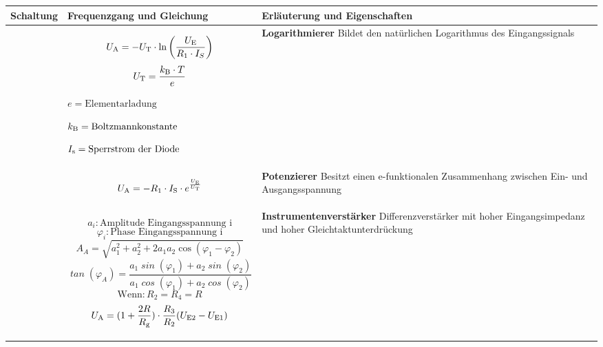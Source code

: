 \newpage
    \begin{table}[ht]
        \begin{tabular}{|m{}|m{}|m{}|}
            \hline 
    Schaltung & Frequenzgang und Gleichung & Erläuterung und Eigenschaften \\ %
    \hline
    
    &
    \begin{center}
    \[
    U_{\textnormal{A}} =-U_{\textnormal{T}}\cdot \ln{\left(\frac{U_{\textnormal{E}}}{R_1\cdot I_S}\right)}
    \]
        \[
            U_{\textnormal{T}} = \frac{k_{\textnormal{B}} \cdot T}{e}
            \]
            
            \(e = \text{Elementarladung}\)
            
            \(k_{\textnormal{B}} = \text{Boltzmannkonstante}\)
            
            \(I_{\textnormal{s}} = \text{Sperrstrom der Diode}\)
    \end{center} 
    & 
    \textbf{Logarithmierer}\newline
    Bildet den natürlichen Logarithmus des Eingangssignals
    \\
    \hline
    
    &
    \begin{center}
    \[
    U_{\textnormal{A}} =-R_1\cdot I_{\textnormal{S}} \cdot e^{\frac{U_{\textnormal{E}}}{U_{\textnormal{T}}}}
    \]
    \end{center} 
    & 
    \textbf{Potenzierer}\newline
    Besitzt einen e-funktionalen Zusammenhang zwischen Ein- und Ausgangsspannung
    \\
    \hline
    
     &
         \begin{center}
   
\end{center}

\vspace{1ex}
\[
\mathit{a_i} : \text{Amplitude Eingangsspannung i}
\]
\[
\mathit{\varphi_i} : \text{Phase Eingangsspannung i}
\]
\[
\mathit{A}_{A} = \sqrt{a_1^2 + a_2^2 + 2a_1a_2 \cos(\varphi_1 - \varphi_2)}
\]
\[
\mathit{\tan}(\varphi_A) = \frac{a_1 \mathit{\sin}(\varphi_1) + a_2 \mathit{\sin}(\varphi_2)}{a_1 \mathit{\cos}(\varphi_1) + a_2 \mathit{\cos}(\varphi_2)}
\]
\[
    \text{Wenn} : R_2 = R_4 = R
\]
\[
    U_{\textnormal{A}} = (1+ \frac{2R} {R_{\textnormal{g}}}) \cdot \frac{R_3} {R_2} (U_{\textnormal{E2}}-U_{\textnormal{E1}})
\]
     & 
     \textbf{Instrumentenverstärker}\newline
    Differenzverstärker mit hoher Eingangsimpedanz und hoher Gleichtaktunterdrückung  

    \\
    \hline
    \end{tabular}
\end{table}


